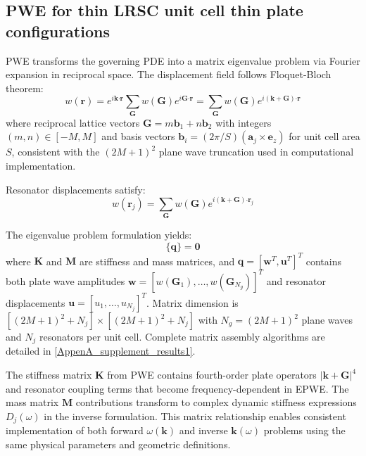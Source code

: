 \documentclass[review,numbers,sort&compress]{elsarticle}
\begin{document}
\subsection{PWE for thin LRSC unit cell thin plate configurations}\label{pwe}

PWE transforms the governing PDE into a matrix eigenvalue problem via Fourier expansion in reciprocal space. The displacement field follows Floquet-Bloch theorem:
\begin{equation}    
	w(\mathbf{r}) = e^{i\mathbf{k}\pmb{\cdot}\mathbf{r}}\sum_{\mathbf{G}}w(\mathbf{G})e^{i\mathbf{G}\pmb{\cdot}\mathbf{r}} = \sum_{\mathbf{G}}w(\mathbf{G})e^{i(\mathbf{k}+\mathbf{G})\pmb{\cdot}\mathbf{r}}
	\label{eq_wave_bloch_pwe}
\end{equation}
where reciprocal lattice vectors $\mathbf{G}=m\mathbf{b}_{1}+n\mathbf{b}_{2}$ with integers $(m,n) \in [-M,M]$ and basis vectors $\mathbf{b}_{i}=(2\pi/S)(\mathbf{a}_{j} \times \mathbf{e}_z)$ for unit cell area $S$, consistent with the $(2M+1)^2$ plane wave truncation used in computational implementation. 

Resonator displacements satisfy:
\begin{equation}
	w(\mathbf{r}_j) = \sum_{\mathbf{G}}w(\mathbf{G})e^{i(\mathbf{k}+\mathbf{G})\pmb{\cdot}\mathbf{r}_j}
    \label{eq_disp_expanded_four}
\end{equation}

The eigenvalue problem formulation yields:
\begin{equation}  
	[\mathbf{K}-\omega^{2}\mathbf{M}]\bigl\{ \mathbf{q} \bigr\} = \mathbf{0}
	\label{eigenvector_problem_pwe}  
\end{equation}  
where $\mathbf{K}$ and $\mathbf{M}$ are stiffness and mass matrices, and $\mathbf{q} = [\mathbf{w}^T, \mathbf{u}^T]^T$ contains both plate wave amplitudes $\mathbf{w} = [w(\mathbf{G}_1), \ldots, w(\mathbf{G}_{N_g})]^T$ and resonator displacements $\mathbf{u} = [u_1, \ldots, u_{N_j}]^T$. Matrix dimension is $[(2M+1)^2 + N_j] \times [(2M+1)^2 + N_j]$ with $N_g = (2M+1)^2$ plane waves and $N_j$ resonators per unit cell. Complete matrix assembly algorithms are detailed in \ref{AppenA_supplement_results1}.

The stiffness matrix $\mathbf{K}$ from PWE contains fourth-order plate operators $|\mathbf{k}+\mathbf{G}|^4$ and resonator coupling terms that become frequency-dependent in EPWE. The mass matrix $\mathbf{M}$ contributions transform to complex dynamic stiffness expressions $D_j(\omega)$ in the inverse formulation. This matrix relationship enables consistent implementation of both forward $\omega(\mathbf{k})$ and inverse $\mathbf{k}(\omega)$ problems using the same physical parameters and geometric definitions.
\end{document}
